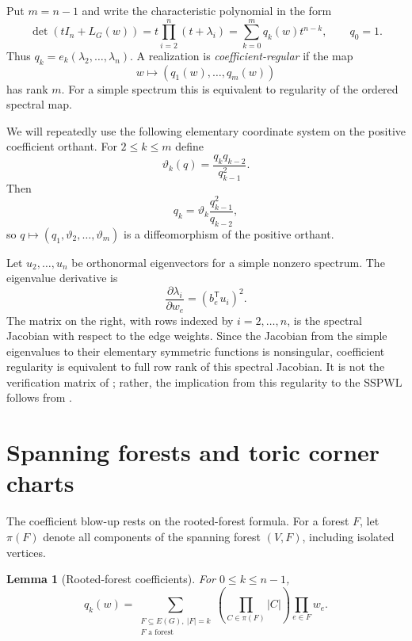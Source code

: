\documentclass[11pt,reqno]{amsart}
\newtheorem{lemma}[theorem]{Lemma}
\theoremstyle{definition}
\theoremstyle{remark}
\newcommand{\SSPWL}{\ensuremath{\mathrm{SSPWL}}}
\begin{document}
Put $m=n-1$ and write the characteristic polynomial in the form
\begin{equation}\label{eq:q-def}
 \det(tI_n+L_G(w))
 =t\prod_{i=2}^n(t+\lambda_i)
 =\sum_{k=0}^{m}q_k(w)t^{n-k},
 \qquad q_0=1.
\end{equation}
Thus $q_k=e_k(\lambda_2,\ldots,\lambda_n)$.  A realization is
\emph{coefficient-regular} if the map
\[
 w\longmapsto(q_1(w),\ldots,q_m(w))
\]
has rank $m$.  For a simple spectrum this is equivalent to regularity of the
ordered spectral map.

We will repeatedly use the following elementary coordinate system on the
positive coefficient orthant.  For $2\le k\le m$ define
\begin{equation}\label{eq:theta-def}
 \vartheta_k(q)=\frac{q_kq_{k-2}}{q_{k-1}^2}.
\end{equation}
Then
\begin{equation}\label{eq:q-recursion}
 q_k=\vartheta_k\frac{q_{k-1}^2}{q_{k-2}},
\end{equation}
so $q\mapsto(q_1,\vartheta_2,\ldots,\vartheta_m)$ is a diffeomorphism of
the positive orthant.

Let $u_2,\ldots,u_n$ be orthonormal eigenvectors for a simple nonzero
spectrum.  The eigenvalue derivative is
\begin{equation}\label{eq:eigen-derivative}
 \frac{\partial\lambda_i}{\partial w_e}
 =(b_e^{\mathsf T}u_i)^2.
\end{equation}
The matrix on the right, with rows indexed by $i=2,\ldots,n$, is the
spectral Jacobian with respect to the edge weights.  Since the Jacobian from
the simple eigenvalues to their elementary symmetric functions is
nonsingular, coefficient regularity is equivalent to full row rank of this
spectral Jacobian.  It is not the verification matrix of
\cite{CFGL2026}; rather, the implication from this regularity to the
\SSPWL follows from \cite[Theorem~3.8]{CFGL2026}.

\section{Spanning forests and toric corner charts}\label{sec:toric}

The coefficient blow-up rests on the rooted-forest formula.  For a forest
$F$, let $\pi(F)$ denote all components of the spanning forest $(V,F)$,
including isolated vertices.

\begin{lemma}[Rooted-forest coefficients]\label{lem:forest}
For $0\le k\le n-1$,
\begin{equation}\label{eq:forest-formula}
 q_k(w)=
 \sum_{\substack{F\subseteq E(G),\ |F|=k\\F\text{ a forest}}}
 \left(\prod_{C\in\pi(F)}|C|\right)\prod_{e\in F}w_e.
\end{equation}
\end{lemma}
\end{document}
